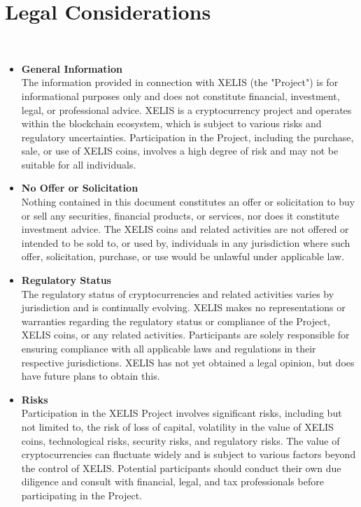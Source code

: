 \documentclass[10pt,a4paper,twocolumn]{article}
\begin{document}
\section{Legal Considerations}\\
\begin{itemize}
\item \textbf{General Information}\\

The information provided in connection with XELIS (the "Project") is for informational purposes only and does not constitute financial, investment, legal, or professional advice. XELIS is a cryptocurrency project and operates within the blockchain ecosystem, which is subject to various risks and regulatory uncertainties. Participation in the Project, including the purchase, sale, or use of XELIS coins, involves a high degree of risk and may not be suitable for all individuals.\\

\item \textbf{No Offer or Solicitation}\\

Nothing contained in this document constitutes an offer or solicitation to buy or sell any securities, financial products, or services, nor does it constitute investment advice. The XELIS coins and related activities are not offered or intended to be sold to, or used by, individuals in any jurisdiction where such offer, solicitation, purchase, or use would be unlawful under applicable law.\\

\item \textbf{Regulatory Status}\\

The regulatory status of cryptocurrencies and related activities varies by jurisdiction and is continually evolving. XELIS makes no representations or warranties regarding the regulatory status or compliance of the Project, XELIS coins, or any related activities. Participants are solely responsible for ensuring compliance with all applicable laws and regulations in their respective jurisdictions. XELIS has not yet obtained a legal opinion, but does have future plans to obtain this. \\

\item \textbf{Risks}\\

Participation in the XELIS Project involves significant risks, including but not limited to, the risk of loss of capital, volatility in the value of XELIS coins, technological risks, security risks, and regulatory risks. The value of cryptocurrencies can fluctuate widely and is subject to various factors beyond the control of XELIS. Potential participants should conduct their own due diligence and consult with financial, legal, and tax professionals before participating in the Project.\\


\end{itemize}
\end{document}
